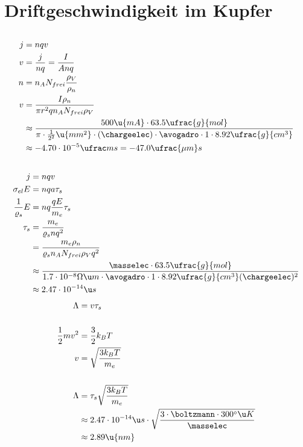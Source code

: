 \documentclass[11pt, german]{article}
\begin{document}
\section{Driftgeschwindigkeit im Kupfer}
\subsection{}
\begin{align*}
    j &= nqv\\
    v &= \frac{j}{nq} = \frac{I}{A n q }\\
    n &= n_A N_{frei} \frac{\rho_V}{\rho_n}\\
    v &=  \frac{I\rho_n}{\pi r^2 q n_A N_{frei} \rho_V }\\
    &\approx \frac{500\u{mA}\cdot63.5\ufrac{g}{mol}}{\pi \cdot \frac{1}{2^2} \u{mm^2} \cdot (\chargeelec)\cdot\avogadro \cdot 1 \cdot 8.92\ufrac{g}{cm^3} }\\
    &\approx -4.70\cdot 10^{-5}\ufrac m s = -47.0 \ufrac{\mu m}s
\end{align*}

\subsection{}
\begin{align*}
    j &= n q  v\\
    \sigma_{el} E &= n q a \tau_s\\
    \frac{1}{\varrho_s}E &= n q \frac{qE}{m_e}\tau_s\\
    \tau_s &= \frac{m_e }{\varrho_s n q^2}\\
    &= \frac{m_e \rho_n}{\varrho_s n_A N_{frei} \rho_V q^2}\\
    &\approx \frac{\masselec \cdot 63.5 \ufrac{g}{mol}}
    {1.7\cdot 10^{-8}\Omega\u m \cdot \avogadro \cdot 1 \cdot 8.92 \ufrac{g}{cm^3}(\chargeelec)^2}\\
    &\approx 2.47\cdot 10^{-14}\u s\\
\end{align*}
\begin{align*}
    \Lambda &= v \tau_s\\
     \\
    \frac 12 m v^2 &= \frac{3}{2}k_B T\\
    v &= \sqrt{\frac{3k_B T}{m_e}} \\
    \\
    \Lambda &= \tau_s \sqrt{\frac{3k_B T}{m_e}}\\
    &\approx  2.47\cdot 10^{-14}\u s \cdot \sqrt{\frac{3\cdot \boltzmann\cdot 300^\circ \u K}{\masselec}}\\
    &\approx 2.89 \u{nm}
\end{align*}
\end{document}
